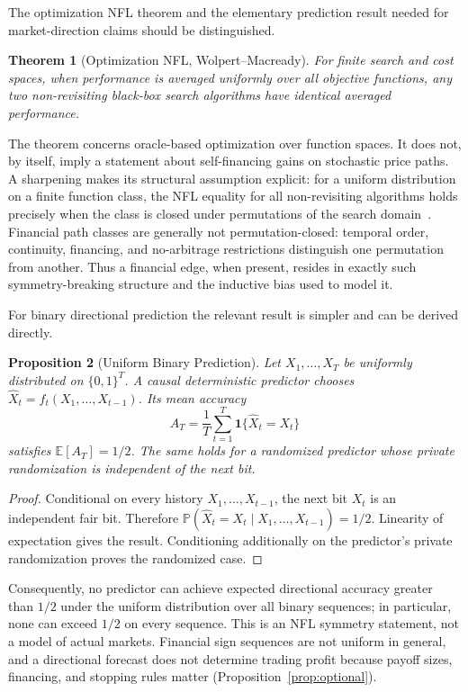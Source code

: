 \documentclass[aps,pra,reprint,superscriptaddress,amsmath,amssymb,floatfix]{revtex4-2}
\theoremstyle{plain}
\newtheorem{theorem}{Theorem}
\newtheorem{proposition}[theorem]{Proposition}
\theoremstyle{definition}
\theoremstyle{remark}
\begin{document}
The optimization NFL theorem and the elementary prediction result needed for
market-direction claims should be distinguished.

\begin{theorem}[Optimization NFL, Wolpert--Macready]
  \label{thm:nfl}
  For finite search and cost spaces, when performance is averaged uniformly
  over all objective functions, any two non-revisiting black-box search
  algorithms have identical averaged performance.
\end{theorem}

The theorem concerns oracle-based optimization over function spaces. It does
not, by itself, imply a statement about self-financing gains on stochastic
price paths. A sharpening makes its structural assumption explicit: for a
uniform distribution on a finite function class, the NFL equality for all
non-revisiting algorithms holds precisely when the class is closed under
permutations of the search domain~\cite{SchumacherVoseWhitley2001}. Financial
path classes are generally not permutation-closed: temporal order, continuity,
financing, and no-arbitrage restrictions distinguish one permutation from
another. Thus a financial edge, when present, resides in exactly such
symmetry-breaking structure and the inductive bias used to model it.

For binary directional prediction the relevant result is simpler and can be
derived directly.

\begin{proposition}[Uniform Binary Prediction]
  \label{prop:binary}
  Let \(X_1,\ldots,X_T\) be uniformly distributed on \(\{0,1\}^T\). A causal
  deterministic predictor chooses
  \(\widehat X_t=f_t(X_1,\ldots,X_{t-1})\). Its mean accuracy
  \[
    A_T=\frac1T\sum_{t=1}^T
      \mathbf{1}\{\widehat X_t=X_t\}
  \]
  satisfies \(\mathbb{E}[A_T]=1/2\). The same holds for a randomized predictor
  whose private randomization is independent of the next bit.
\end{proposition}

\begin{proof}
Conditional on every history \(X_1,\ldots,X_{t-1}\), the next bit \(X_t\) is
an independent fair bit. Therefore
\(\mathbb{P}(\widehat X_t=X_t\mid X_1,\ldots,X_{t-1})=1/2\).
Linearity of expectation gives the result. Conditioning additionally on the
predictor's private randomization proves the randomized case.
\end{proof}

Consequently, no predictor can achieve expected directional accuracy greater
than \(1/2\) under the uniform distribution over all binary sequences; in
particular, none can exceed \(1/2\) on every sequence. This is an NFL symmetry
statement, not a model of actual markets. Financial sign sequences are not
uniform in general, and a directional forecast does not determine trading
profit because payoff sizes, financing, and stopping rules matter
(Proposition~\ref{prop:optional}).
\end{document}
